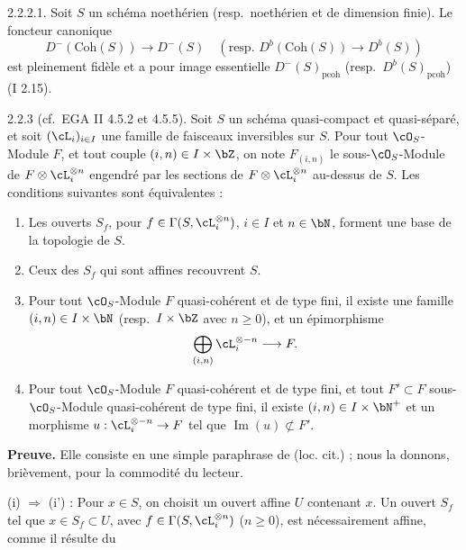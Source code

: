 \begin{corollaire} 2.2.2.1.
Soit $S$ un sch\'{e}ma noeth\'{e}rien (resp.~noeth\'{e}rien et de dimension finie). Le foncteur canonique
\[
D^-(\mathrm{Coh}(S)) \longrightarrow D^-(S) \quad (\text{resp. } D^b(\mathrm{Coh}(S)) \longrightarrow D^b(S))
\]
est pleinement fid\`{e}le et a pour image essentielle $D^-(S)_{\mathrm{pcoh}}$ (resp.~$D^b(S)_{\mathrm{pcoh}}$) (I 2.15).
\end{corollaire}


\begin{proposition} 2.2.3 (cf.~EGA II 4.5.2 et 4.5.5).
Soit $S$ un sch\'{e}ma quasi-compact et quasi-s\'{e}par\'{e}, et soit $(\cL_i)_{i \in I}$ une famille de faisceaux inversibles sur $S$. Pour tout $\cO_S$-Module $F$, et tout couple $(i,n) \in I \times \bZ$, on note $F_{(i,n)}$ le sous-$\cO_S$-Module de $F \otimes \cL_i^{\otimes n}$ engendr\'{e} par les sections de $F \otimes \cL_i^{\otimes n}$ au-dessus de $S$. Les conditions suivantes sont \'{e}quivalentes :
\begin{enumerate}
\item[(i)] Les ouverts $S_f$, pour $f \in \Gamma(S, \cL_i^{\otimes n})$, $i \in I$ et $n \in \bN$, forment une base de la topologie de $S$.
\item[(i')] Ceux des $S_f$ qui sont affines recouvrent $S$.
\item[(ii)] Pour tout $\cO_S$-Module $F$ quasi-coh\'{e}rent et de type fini, il existe une famille $(i,n) \in I \times \bN$ (resp.~$I \times \bZ$ avec $n \geq 0$), et un \'{e}pimorphisme
\[
\bigoplus_{(i,n)} \cL_i^{\otimes -n} \longrightarrow F .
\]
\item[(iii)] Pour tout $\cO_S$-Module $F$ quasi-coh\'{e}rent et de type fini, et tout $F' \subset F$ sous-$\cO_S$-Module quasi-coh\'{e}rent de type fini, il existe $(i,n) \in I \times \bN^+$ et un morphisme $u : \cL_i^{\otimes -n} \rightarrow F$ tel que $\operatorname{Im}(u) \not\subset F'$.
\end{enumerate}
\end{proposition}

\noindent\textbf{Preuve.} Elle consiste en une simple paraphrase de (loc. cit.) ; nous la donnons, bri\`{e}vement, pour la commodit\'{e} du lecteur.

(i) $\Rightarrow$ (i') : Pour $x \in S$, on choisit un ouvert affine $U$ contenant $x$. Un ouvert $S_f$ tel que $x \in S_f \subset U$, avec $f \in \Gamma(S, \cL_i^{\otimes n})$ ($n \geq 0$), est n\'{e}cessairement affine, comme il r\'{e}sulte du

